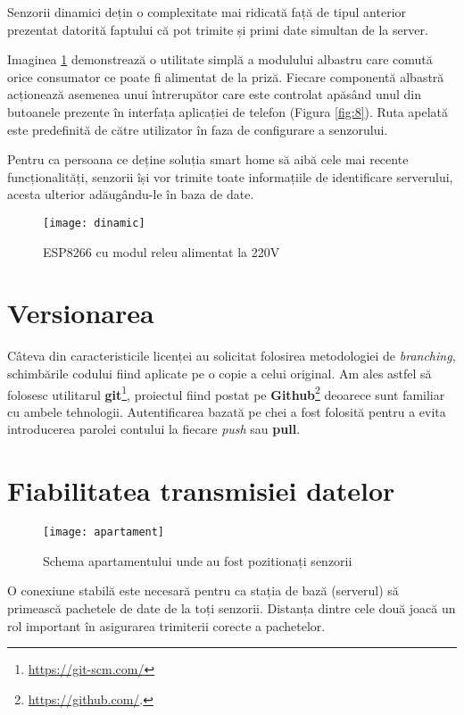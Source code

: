Senzorii dinamici dețin o complexitate mai ridicată față de tipul anterior prezentat datorită faptului că pot trimite și primi date simultan de la server.

Imaginea \ref{fig:dinamic} demonstrează o utilitate simplă a modulului albastru care comută orice consumator ce poate fi alimentat de la priză. Fiecare componentă albastră acționează asemenea unui întrerupător care este controlat apăsând unul din butoanele prezente în interfața aplicației de telefon (Figura \ref{fig:8}). Ruta apelată este predefinită de către utilizator în faza de configurare a senzorului.

Pentru ca persoana ce deține soluția smart home să aibă cele mai recente funcționalități, senzorii își vor trimite toate informațiile de identificare serverului, acesta ulterior adăugându-le în baza de date.

\begin{figure}[h]
	\centering
	\texttt{[image: dinamic]}
	\caption{ESP8266 cu modul releu alimentat la 220V}
	\label{fig:dinamic}
\end{figure}

\section{Versionarea}

Câteva din caracteristicile licenței au solicitat folosirea metodologiei de \emph{branching}, schimbările codului fiind aplicate pe o copie a celui original. Am ales astfel să folosesc utilitarul \textbf{git}\footnote{\url{https://git-scm.com/}}, proiectul fiind postat pe \textbf{Github}\footnote{\url{https://github.com/}.} deoarece sunt familiar cu ambele tehnologii. Autentificarea bazată pe chei a fost folosită pentru a evita introducerea parolei contului la fiecare \emph{push} sau \textbf{pull}.

\newpage

\section{Fiabilitatea transmisiei datelor}

\begin{figure}[h]
	\centering
	\texttt{[image: apartament]}
	\caption{Schema apartamentului unde au fost pozitionați senzorii}
	\label{fig:apartament}
\end{figure}

O conexiune stabilă este necesară pentru ca stația de bază (serverul) să primească pachetele de date de la toți senzorii. Distanța dintre cele două joacă un rol important în asigurarea trimiterii corecte a pachetelor.

